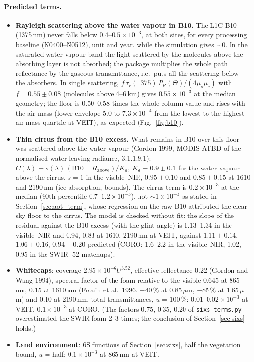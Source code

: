 \documentclass[11pt,a4paper]{article}
\newcommand{\code}[1]{\texttt{#1}}
\begin{document}
\paragraph{Predicted terms.}
\begin{itemize}
\item \textbf{Rayleigh scattering above the water vapour in B10.} The L1C B10 (1375\,nm) never falls below
  $0.4$--$0.5\times10^{-3}$, at both sites, for every processing baseline (N0400--N0512), unit and year, while the
  simulation gives $\sim$0. In the saturated water-vapour band the light scattered by the molecules above the
  absorbing layer is not absorbed; the package multiplies the whole path reflectance by the gaseous transmittance,
  i.e.\ puts all the scattering below the absorbers. In single scattering, $f\,\tau_r(1375)\,P_R(\Theta)/(4\mu_s\mu_v)$
  with $f = 0.55\pm0.08$ (molecules above 4--6\,km) gives $0.55\times10^{-3}$ at the median geometry; the floor is
  0.50--0.58 times the whole-column value and rises with the air mass (lower envelope 5.0 to $7.3\times10^{-4}$ from
  the lowest to the highest air-mass quartile at VEIT), as expected (Fig.~\ref{fig:b10}).
\item \textbf{Thin cirrus from the B10 excess.} What remains in B10 over this floor was scattered above the water
  vapour (Gordon 1999, MODIS ATBD of the normalised water-leaving radiance, 3.1.1.9.1): $C(\lambda) = s(\lambda)\,
  (\mathrm{B10} - R_\mathrm{above})/K_a$, $K_a = 0.9\pm0.1$ for the water vapour above the cirrus, $s = 1$ in the
  visible--NIR, $0.95\pm0.10$ and $0.85\pm0.15$ at 1610 and 2190\,nm (ice absorption, bounds). The cirrus term is
  $0.2\times10^{-3}$ at the median (90th percentile 0.7--$1.2\times10^{-3}$), not $\sim1\times10^{-3}$ as stated in
  Section~\ref{sec:aot_term}, whose regression on the raw B10 attributed the clear-sky floor to the cirrus. The model
  is checked without fit: the slope of the residual against the B10 excess (with the glint angle) is 1.13--1.34 in
  the visible--NIR and 0.94, 0.83 at 1610, 2190\,nm at VEIT, against $1.11\pm0.14$, $1.06\pm0.16$, $0.94\pm0.20$
  predicted (CORO: 1.6--2.2 in the visible--NIR, 1.02, 0.95 in the SWIR, 52 matchups).
\item \textbf{Whitecaps}: coverage $2.95\times10^{-6}U^{3.52}$, effective reflectance 0.22 (Gordon and Wang 1994),
  spectral factor of the foam relative to the visible 0.645 at 865\,nm, 0.15 at 1610\,nm (Frouin et al.\ 1996:
  $-40\,\%$ at 0.85\,$\mu$m, $-85\,\%$ at 1.65\,$\mu$m) and 0.10 at 2190\,nm, total transmittances, $u$ = 100\,\%:
  0.01--$0.02\times10^{-3}$ at VEIT, $0.1\times10^{-3}$ at CORO. (The factors 0.75, 0.35, 0.20 of
  \code{sixs\_terms.py} overestimated the SWIR foam 2--3 times; the conclusion of Section~\ref{sec:sixs} holds.)
\item \textbf{Land environment}: 6S functions of Section~\ref{sec:sixs}, half the vegetation bound, $u$ = half:
  $0.1\times10^{-3}$ at 865\,nm at VEIT.
\end{itemize}
\end{document}
